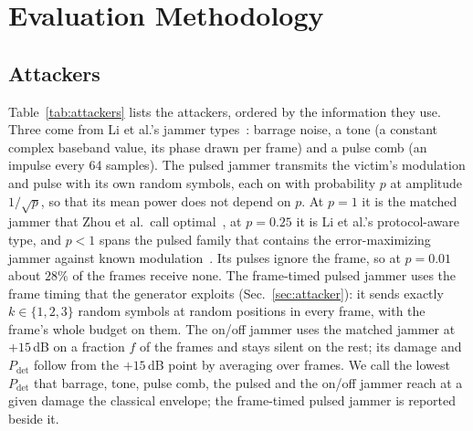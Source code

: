 \section{Evaluation Methodology}\label{sec:method}

\subsection{Attackers}\label{sec:method:attackers}
Table~\ref{tab:attackers} lists the attackers, ordered by the information they use.
Three come from Li et al.'s jammer types~\cite{li2022jamming_ofdm}: barrage noise, a tone (a constant complex baseband value, its phase drawn per frame) and a pulse comb (an impulse every 64 samples).
The pulsed jammer transmits the victim's modulation and pulse with its own random symbols, each on with probability $p$ at amplitude $1/\sqrt p$, so that its mean power does not depend on $p$.
At $p=1$ it is the matched jammer that Zhou et al.\ call optimal~\cite{11184988}, at $p=0.25$ it is Li et al.'s protocol-aware type, and $p<1$ spans the pulsed family that contains the error-maximizing jammer against known modulation~\cite{amuru2015optimal}.
Its pulses ignore the frame, so at $p=0.01$ about $28\%$ of the frames receive none.
The frame-timed pulsed jammer uses the frame timing that the generator exploits (Sec.~\ref{sec:attacker}): it sends exactly $k\in\{1,2,3\}$ random symbols at random positions in every frame, with the frame's whole budget on them.
The on/off jammer uses the matched jammer at $+15$\,dB on a fraction $f$ of the frames and stays silent on the rest; its damage and $P_{\mathrm{det}}$ follow from the $+15$\,dB point by averaging over frames.
We call the lowest $P_{\mathrm{det}}$ that barrage, tone, pulse comb, the pulsed and the on/off jammer reach at a given damage the classical envelope; the frame-timed pulsed jammer is reported beside it.

